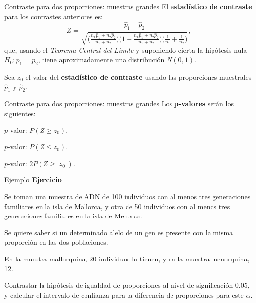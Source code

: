 \documentclass[
  ignorenonframetext,
]{beamer}
\begin{document}
\begin{frame}{Contraste para dos proporciones: muestras grandes}
\protect\hypertarget{contraste-para-dos-proporciones-muestras-grandes-2}{}
El \textbf{estadístico de contraste} para los contrastes anteriores es:
\[Z=\frac{\widehat{p}_1 -\widehat{p}_2}{
\sqrt{\Big(\frac{n_1 \widehat{p}_1 +n_2 \widehat{p}_2}{n_1
+n_2}\Big)\Big(1-\frac{n_1 \widehat{p}_1 +n_2 \widehat{p}_2}{n_1
+n_2}\Big)\Big(\frac1{n_1}+\frac1{n_2}
\Big)}},\] que, usando el \emph{Teorema Central del Límite} y suponiendo
cierta la hipótesis nula \(H_0:p_1=p_2\), tiene aproximadamente una
distribución \(N(0,1)\).

Sea \(z_0\) el valor del \textbf{estadístico de contraste} usando las
proporciones muestrales \(\widehat{p}_1\) y \(\widehat{p}_2\).
\end{frame}

\begin{frame}{Contraste para dos proporciones: muestras grandes}
\protect\hypertarget{contraste-para-dos-proporciones-muestras-grandes-3}{}
Los \textbf{p-valores} serán los siguientes:

\(p\)-valor: \(P(Z\geq z_0)\).

\(p\)-valor: \(P(Z\leq z_0)\).

\(p\)-valor: \(2 P(Z \geq |z_0|)\).
\end{frame}

\begin{frame}{Ejemplo}
\protect\hypertarget{ejemplo-12}{}
\textbf{Ejercicio}

Se toman una muestra de ADN de 100 individuos con al menos tres
generaciones familiares en la isla de Mallorca, y otra de 50 individuos
con al menos tres generaciones familiares en la isla de Menorca.

Se quiere saber si un determinado alelo de un gen es presente con la
misma proporción en las dos poblaciones.

En la muestra mallorquina, 20 individuos lo tienen, y en la muestra
menorquina, 12.

Contrastar la hipótesis de igualdad de proporciones al nivel de
significación \(0.05\), y calcular el intervalo de confianza para la
diferencia de proporciones para este \(\alpha\).
\end{frame}
\end{document}
